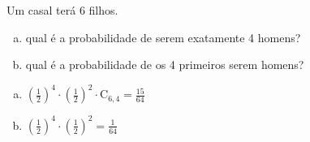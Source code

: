 \begin{ex}
Um casal terá 6 filhos.
   \begin{enumerate}[(a)]
   \item qual é a probabilidade de serem exatamente 4 homens?
   \item qual é a probabilidade de os 4 primeiros serem homens?
   \end{enumerate}
     \begin{sol}
       \phantom{A} 
         \begin{enumerate} [(a)]
             \item $(\frac{1}{2})^4\cdot(\frac{1}{2})^2\cdot \mathrm{C}_{6,4}=\frac{15}{64}$
             \item $(\frac{1}{2})^4\cdot(\frac{1}{2})^2=\frac{1}{64}$ 
         \end{enumerate}
     \end{sol}
\end{ex}